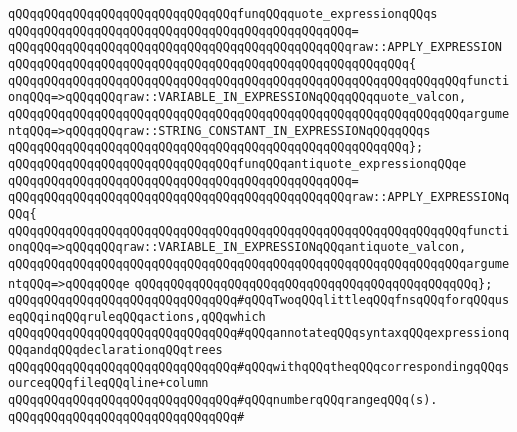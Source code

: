 \newline
\verb|qQQqqQQqqQQqqQQqqQQqqQQqqQQqqQQqfunqQQqquote_expressionqQQqs|\newline
\verb|qQQqqQQqqQQqqQQqqQQqqQQqqQQqqQQqqQQqqQQqqQQqqQQq=|\newline
\verb|qQQqqQQqqQQqqQQqqQQqqQQqqQQqqQQqqQQqqQQqqQQqqQQqraw::APPLY_EXPRESSION|\newline
\verb|qQQqqQQqqQQqqQQqqQQqqQQqqQQqqQQqqQQqqQQqqQQqqQQqqQQqqQQq{|\newline
\verb|qQQqqQQqqQQqqQQqqQQqqQQqqQQqqQQqqQQqqQQqqQQqqQQqqQQqqQQqqQQqqQQqfunctionqQQq=>qQQqqQQqraw::VARIABLE_IN_EXPRESSIONqQQqqQQqquote_valcon,|\newline
\verb|qQQqqQQqqQQqqQQqqQQqqQQqqQQqqQQqqQQqqQQqqQQqqQQqqQQqqQQqqQQqqQQqargumentqQQq=>qQQqqQQqraw::STRING_CONSTANT_IN_EXPRESSIONqQQqqQQqs|\newline
\verb|qQQqqQQqqQQqqQQqqQQqqQQqqQQqqQQqqQQqqQQqqQQqqQQqqQQqqQQq};|\newline
\newline
\verb|qQQqqQQqqQQqqQQqqQQqqQQqqQQqqQQqfunqQQqantiquote_expressionqQQqe|\newline
\verb|qQQqqQQqqQQqqQQqqQQqqQQqqQQqqQQqqQQqqQQqqQQqqQQq=|\newline
\verb|qQQqqQQqqQQqqQQqqQQqqQQqqQQqqQQqqQQqqQQqqQQqqQQqraw::APPLY_EXPRESSIONqQQq{|\newline
\verb|qQQqqQQqqQQqqQQqqQQqqQQqqQQqqQQqqQQqqQQqqQQqqQQqqQQqqQQqqQQqqQQqfunctionqQQq=>qQQqqQQqraw::VARIABLE_IN_EXPRESSIONqQQqantiquote_valcon,|\newline
\verb|qQQqqQQqqQQqqQQqqQQqqQQqqQQqqQQqqQQqqQQqqQQqqQQqqQQqqQQqqQQqqQQqargumentqQQq=>qQQqqQQqe|\newline
\verb|qQQqqQQqqQQqqQQqqQQqqQQqqQQqqQQqqQQqqQQqqQQqqQQq};|\newline
\newline
\newline
\verb|qQQqqQQqqQQqqQQqqQQqqQQqqQQqqQQq#qQQqTwoqQQqlittleqQQqfnsqQQqforqQQquseqQQqinqQQqruleqQQqactions,qQQqwhich|\newline
\verb|qQQqqQQqqQQqqQQqqQQqqQQqqQQqqQQq#qQQqannotateqQQqsyntaxqQQqexpressionqQQqandqQQqdeclarationqQQqtrees|\newline
\verb|qQQqqQQqqQQqqQQqqQQqqQQqqQQqqQQq#qQQqwithqQQqtheqQQqcorrespondingqQQqsourceqQQqfileqQQqline+column|\newline
\verb|qQQqqQQqqQQqqQQqqQQqqQQqqQQqqQQq#qQQqnumberqQQqrangeqQQq(s).|\newline
\verb|qQQqqQQqqQQqqQQqqQQqqQQqqQQqqQQq#|\newline
